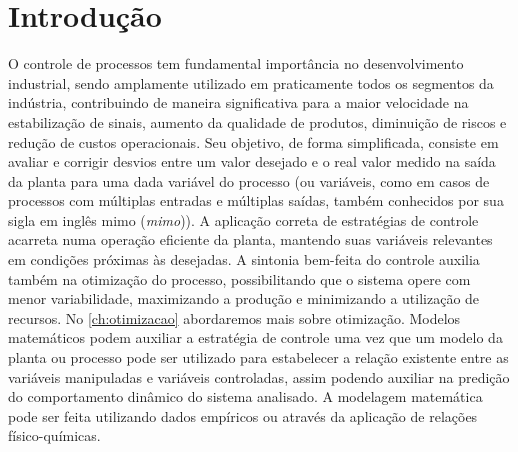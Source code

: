 \chapter{Introdução}
\label{ch:introducao}

O controle de processos tem fundamental importância no desenvolvimento industrial,
sendo amplamente utilizado em praticamente todos os segmentos da indústria,
contribuindo de maneira significativa para a maior velocidade na estabilização de sinais,
aumento da qualidade de produtos, diminuição de riscos e redução de custos operacionais.
Seu objetivo, de forma simplificada, consiste em avaliar e corrigir desvios entre um
valor desejado e o real valor medido na saída da planta para uma dada variável do
processo (ou variáveis, como em casos de processos com múltiplas entradas e múltiplas
saídas, também conhecidos por sua sigla em inglês \acrshort{mimo} (\textit{\acrlong{mimo}})).
A aplicação correta de estratégias de controle acarreta numa operação eficiente da
planta, mantendo suas variáveis relevantes em condições próximas às desejadas.
A sintonia bem-feita do controle auxilia também na otimização do processo,
possibilitando que o sistema opere com menor variabilidade, maximizando a produção
e minimizando a utilização de recursos. No \cref{ch:otimizacao} abordaremos mais
sobre otimização.
Modelos matemáticos podem auxiliar a estratégia de controle uma vez que um modelo da
planta ou processo pode ser utilizado para estabelecer a relação existente entre as
variáveis manipuladas e variáveis controladas, assim podendo auxiliar na predição do
comportamento dinâmico do sistema analisado. A modelagem matemática pode ser feita
utilizando dados empíricos ou através da aplicação de relações físico-químicas.

